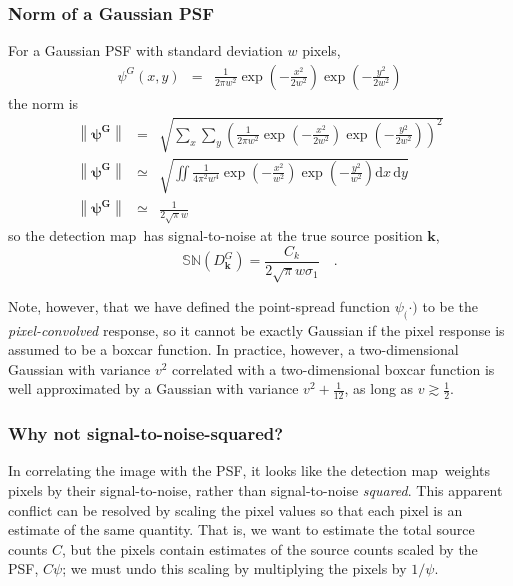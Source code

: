 \documentclass[letterpaper,preprint]{aastex62}
\newcommand{\detmap}{detection map}
\newcommand{\psf}{\psi}
\newcommand{\psfat}[1]{\psf_{#1}}
\newcommand{\snr}[1]{\mathbb{SN}(#1)}
\newcommand{\norm}[1]{\left\lVert #1 \right\rVert}
\newcommand{\psfw}{w}
\renewcommand{\vec}[1]{\boldsymbol{#1}}
\newcommand{\kvec}{\vec{k}}
\begin{document}
\subsubsection{Norm of a Gaussian PSF}
\label{app:gaussnorm}
For a Gaussian PSF with standard deviation $\psfw$ pixels,
\begin{eqnarray}\displaystyle
\psf^G(x,y) &=& \frac{1}{2 \pi \psfw^2} \exp{\left(-\frac{x^2}{2 \psfw^2}\right)} \exp{\left(-\frac{y^2}{2 \psfw^2}\right)}
\end{eqnarray}
the norm is%
\begin{eqnarray}
\norm{\bm{\psf^G}} &=& \sqrt{ \sum_{x} \sum_{y} \left(\frac{1}{2 \pi \psfw^2} \exp{\left(-\frac{x^2}{2 \psfw^2}\right)} \exp{\left(-\frac{y^2}{2 \psfw^2}\right)} \right)^2} \\
\norm{\bm{\psf^G}} &\simeq& \sqrt{\iint \frac{1}{4 \pi^2 \psfw^4} \exp{\left(-\frac{x^2}{\psfw^2}\right)} \exp{\left(-\frac{y^2}{\psfw^2}\right)} \mathrm{d}x \, \mathrm{d}y} \\
\norm{\bm{\psf^G}} &\simeq& \frac{1}{2 \sqrt{\pi} \psfw}
\end{eqnarray}
so the \detmap\ has signal-to-noise at the true source position $\kvec$,
\begin{equation}
\snr{D_{\kvec}^G} = \frac{C_k}{2 \sqrt{\pi} \psfw \sigma_1 } \quad .
\label{eqn:sndsinglegauss}
\end{equation}

Note, however, that we have defined the point-spread function
$\psfat(\cdot)$ to be the \emph{pixel-convolved} response, so it cannot
be exactly Gaussian if the pixel response is assumed to be a boxcar
function.  In practice, however, a two-dimensional Gaussian with
variance $v^2$ correlated with a two-dimensional boxcar function is
well approximated by a Gaussian with variance $v^2 + \frac{1}{12}$, as
long as $v \gtrsim \frac{1}{2}$.





\subsubsection{Why not signal-to-noise-squared?}
In correlating the image with the PSF, it looks like the
\detmap\ weights pixels by their signal-to-noise, rather than
signal-to-noise \emph{squared}.  This apparent conflict can be
resolved by scaling the pixel values so that each pixel is an estimate
of the same quantity.  That is, we want to estimate the total source
counts $C$, but the pixels contain estimates of the source counts
scaled by the PSF, $C \psf$; we must undo this scaling by multiplying
the pixels by $1/\psf$.
\end{document}
